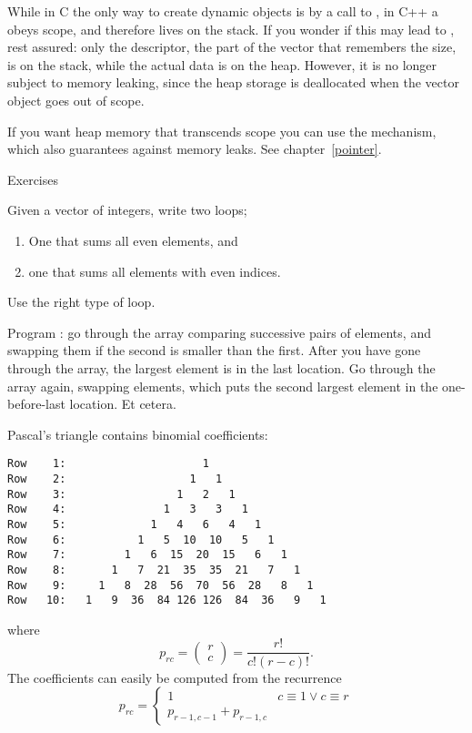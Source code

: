 While in C the only way to create dynamic objects is by a call to
, in C++ a  obeys scope, and
therefore lives on the stack. If you wonder if this may lead to
, rest assured: only the descriptor, the
part of the vector that remembers the size, is on the stack, while the
actual data is on the heap. However, it is no longer subject to memory
leaking, since the heap storage is deallocated when the vector object
goes out of scope.

If you want heap memory that transcends scope you can use the
 mechanism, which also guarantees against
memory leaks. See chapter~\ref{pointer}.

 {Exercises}

\begin{exercise}
  Given a vector of integers, write two loops;
  \begin{enumerate}
  \item One that sums all even elements, and
  \item one that sums all elements with even indices.
  \end{enumerate}
  Use the right type of loop.
\end{exercise}

\begin{exercise}
  Program : go through the array comparing
  successive pairs of elements, and swapping them if the second is
  smaller than the first. After you have gone through the array, the
  largest element is in the last location. Go through the array again,
  swapping elements, which puts the second largest element in the
  one-before-last location. Et cetera.
\end{exercise}

\begin{block}{Pascal's triangle}
  \label{sl:pascal-def}
  \small
   contains binomial coefficients:
{\scriptsize
\begin{verbatim}
Row    1:                     1
Row    2:                   1   1
Row    3:                 1   2   1
Row    4:               1   3   3   1
Row    5:             1   4   6   4   1
Row    6:           1   5  10  10   5   1
Row    7:         1   6  15  20  15   6   1
Row    8:       1   7  21  35  35  21   7   1
Row    9:     1   8  28  56  70  56  28   8   1
Row   10:   1   9  36  84 126 126  84  36   9   1
\end{verbatim}
}
where \[ p_{rc} = \begin{pmatrix} r\\c \end{pmatrix} = \frac{r!}{c!(r-c)! }. \]
The coefficients can easily be computed from the recurrence
\[ p_{rc} = 
\begin{cases}
  1&c\equiv 1\vee c\equiv r\\
  p_{r-1,c-1}+p_{r-1,c}
\end{cases}
\]
\end{block}

